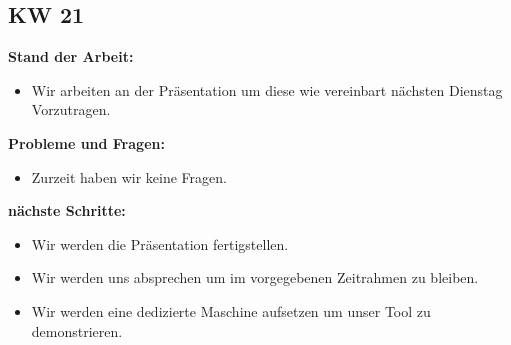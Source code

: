 \documentclass[10pt,paper=a4,final]{scrartcl}
\begin{document}
\subsection{KW 21}
\begin{description}
  \item {\bf Stand der Arbeit: } \\
    \begin{itemize}
      \item Wir arbeiten an der Präsentation um diese wie vereinbart nächsten Dienstag Vorzutragen.
    \end{itemize}
  \item {\bf Probleme und Fragen: } \\
    \begin{itemize}
      \item Zurzeit haben wir keine Fragen.
    \end{itemize}
  \item {\bf nächste Schritte: } \\
    \begin{itemize}
      \item Wir werden die Präsentation fertigstellen.
      \item Wir werden uns absprechen um im vorgegebenen Zeitrahmen zu bleiben.
      \item Wir werden eine dedizierte Maschine aufsetzen um unser Tool zu demonstrieren.
    \end{itemize}
\end{description}
\end{document}
